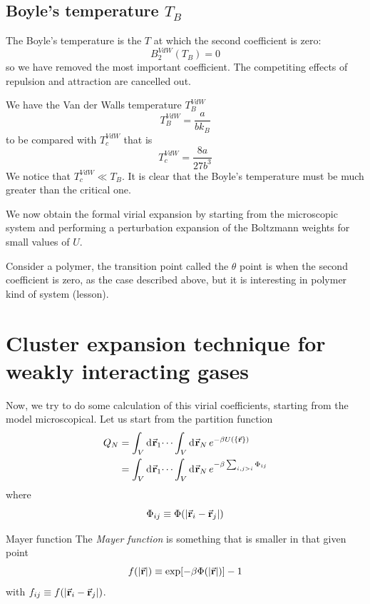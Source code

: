 \documentclass[../main/main.tex]{subfiles}
\begin{document}
\subsection{Boyle's temperature \( T_B \) }
The Boyle's temperature is the \( T \) at which the second coefficient is zero:
\begin{equation}
  B_2^{VdW} (T_B) = 0
\end{equation}
so we have removed the most important coefficient. The competiting effects of repulsion and attraction are cancelled out.

We have the Van der Walls temperature \( T_B^{VdW} \)
\begin{equation}
  T_B^{VdW} = \frac{a}{b k_B}
\end{equation}
to be compared with \( T_c^{VdW} \) that is
\begin{equation}
  T_c^{VdW} = \frac{8 a}{27 b^3}
\end{equation}
We notice that \( T_c^{VdW} \ll T_B \).  It is clear that the Boyle's temperature must be much greater than the critical one.

We now obtain the formal virial expansion by starting from the microscopic system and performing a perturbation expansion of the Boltzmann weights for small values of \( U \).

\begin{remark}
   Consider a polymer, the transition point called the \( \theta  \) point is when the second coefficient is zero, as the case described above, but it is interesting in polymer kind of system (lesson).
\end{remark}

\section{Cluster expansion technique for weakly interacting gases}
Now, we try to do some calculation of this virial coefficients, starting from the model microscopical.
Let us start from the partition function
\begin{equation}
\begin{split}
  Q_N &= \int_{V}^{} \dd[]{\va{r}_1} \dots \int_{V}^{} \dd[]{\va{r}_N}  e^{-\beta U (\{ \va{r} \}  ) } \\
  & = \int_{V}^{} \dd[]{\va{r}_1} \dots \int_{V}^{} \dd[]{\va{r}_N}  e^{-\beta \sum_{i,j > i}^{} \Phi _{ij} }
\end{split}
\end{equation}
where
\begin{equation}
  \Phi _{ij} \equiv \Phi (\abs{\va{r}_i - \va{r}_j} )
\end{equation}
\begin{definition}{Mayer function}{}
  The \emph{Mayer function}  is something that is smaller in that given point
  \begin{equation}
    f (\abs{\va{r}} ) \equiv \exp [ - \beta \Phi ( \abs{\va{r}} )] -1
  \end{equation}
  with \( f_{ij} \equiv f (\abs{\va{r}_i - \va{r}_j} ) \).
\end{definition}
\end{document}
